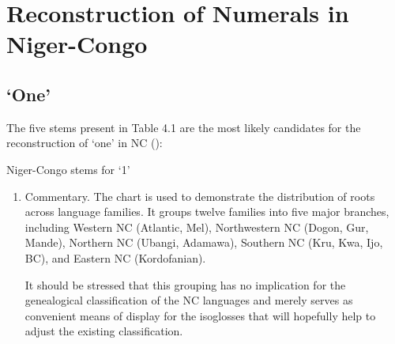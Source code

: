 \chapter{Reconstruction of Numerals in Niger-Congo}
 
\section{‘One’} 
The five stems present in Table 4.1 are the most likely candidates for the reconstruction of ‘one’ in NC ():




\begin{table}
\caption{\label{tab:4:1}Niger-Congo stems for `1'}
\kppyramid












 
\end{table}
\begin{enumerate}
\item Commentary. The chart is used to demonstrate the distribution of roots across language families. It groups twelve families into five major branches, including 
Western NC (Atlantic, Mel),
Northwestern NC (Dogon, Gur, Mande), 
Northern NC (Ubangi, Adamawa),
Southern NC (Kru, Kwa, Ijo, BC), and 
Eastern NC (Kordofanian). 

It should be stressed that this grouping has no implication for the genealogical classification of the NC languages and merely serves as convenient means of display for the isoglosses that will hopefully help to adjust the existing classification.
\end{enumerate}
